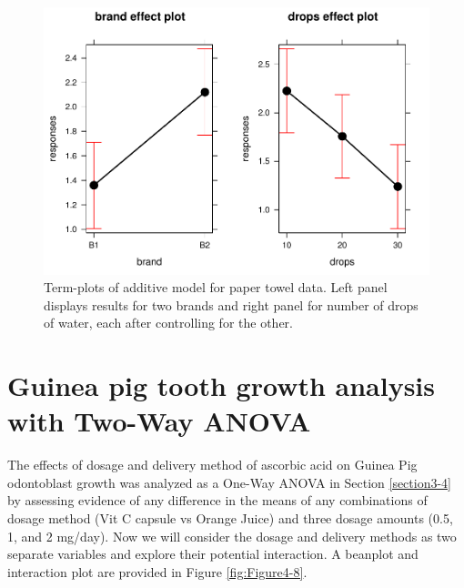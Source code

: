 \documentclass[]{book}
\theoremstyle{definition}
\theoremstyle{definition}
\theoremstyle{remark}
\begin{document}
\begin{figure}
\centering
\includegraphics{04-twoWayAnova_files/figure-latex/Figure4-7-1.pdf}
\caption{\label{fig:Figure4-7}Term-plots of additive model for paper towel data. Left
panel displays results for two brands and right panel for number of
drops of water, each after controlling for the other.}
\end{figure}

\newpage

\section{Guinea pig tooth growth analysis with Two-Way
ANOVA}\label{section4-4}

The effects of dosage and delivery method of ascorbic acid on Guinea Pig
odontoblast growth was analyzed as a One-Way ANOVA in Section
\ref{section3-4} by assessing evidence of any difference in the means of
any combinations of dosage method (Vit C capsule vs Orange Juice) and
three dosage amounts (0.5, 1, and 2 mg/day). Now we will consider the
dosage and delivery methods as two separate variables and explore their
potential interaction. A beanplot and interaction plot are provided in
Figure \ref{fig:Figure4-8}.
\end{document}
